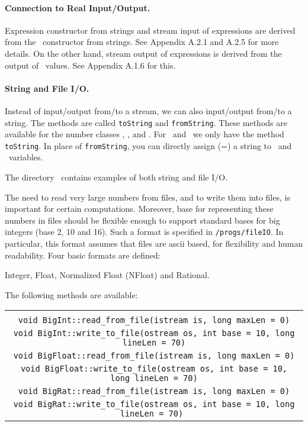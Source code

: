 \documentclass[12pt]{article}
\begin{document}
\paragraph{Connection to Real Input/Output.}
Expression constructor from strings
and stream input of expressions are derived
from the \real\ constructor from strings.
See Appendix A.2.1 and A.2.5 for more details.
On the other hand,
stream output of expressions is derived from
the output of \BF\ values.  
See Appendix A.1.6 for this.

\paragraph{String and File I/O.}
Instead of input/output from/to a stream,
we can also input/output from/to a string.
The methods are called \texttt{toString} and \texttt{fromString}.
These methods are available for the number classes \BF, \Int,
and \Rat.  For \real\ and \expr\ we only have the method
\texttt{toString}.  In place of \texttt{fromString}, you can
directly assign (=) a string to \real\ and \expr\ variables.

The directory \examplesdir\ contains 
examples of both string and file I/O.

The need to read very large numbers from files, and
to write them into files, is important for certain computations.
Moreover, base for representing these numbers in files
should be flexible enough to support standard bases for
big integers (base 2, 10 and 16).
Such a format is specified
in \corepath\texttt{/progs/fileIO}.  In particular, this format assumes that
files are ascii based, for flexibility and human
readability.  Four basic formats are defined:
	\begin{center}
	Integer, Float, Normalized Float (NFloat) and Rational.
	\end{center}
The following methods are available:

\begin{center}
\begin{tabular}{c}
\begin{progb}{
\\
\> \tt void BigInt::read\_from\_file(istream is, long maxLen = 0)
\\
\> \tt void BigInt::write\_to\_file(ostream os, int base = 10, long lineLen = 70)
\\
\> \tt void BigFloat::read\_from\_file(istream is, long maxLen = 0)
\\
\> \tt void BigFloat::write\_to\_file(ostream os,
	int base = 10, long lineLen = 70)
\\
\> \tt void BigRat::read\_from\_file(istream is, long maxLen = 0)
\\
\> \tt void BigRat::write\_to\_file(ostream os, int base = 10, long lineLen = 70)
}\end{progb}
\end{tabular}
\end{center}
\end{document}
